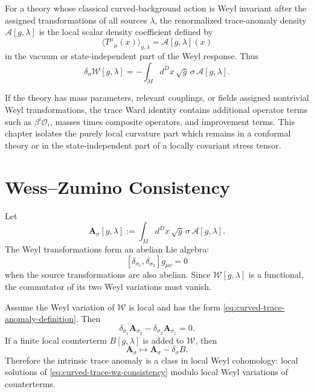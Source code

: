 \begin{definition}
\label{def:curved-trace-anomaly-density}
For a theory whose classical curved-background action is Weyl invariant
after the assigned transformations of all sources \(\lambda\), the
renormalized trace-anomaly density \(\mathcal A[g,\lambda]\) is the local
scalar density coefficient defined by
\[
  \langle T^\mu{}_\mu(x)\rangle_{g,\lambda}
  =
  \mathcal A[g,\lambda](x)
\]
in the vacuum or state-independent part of the Weyl response.  Thus
\begin{equation}
  \delta_\sigma\mathcal W[g,\lambda]
  =
  -\int_M d^D x\,\sqrt g\,\sigma\,\mathcal A[g,\lambda].
  \label{eq:curved-trace-anomaly-definition}
\end{equation}
\end{definition}

If the theory has mass parameters, relevant couplings, or fields assigned
nontrivial Weyl transformations, the trace Ward identity contains additional
operator terms such as \(\beta^i\mathcal O_i\), masses times composite
operators, and improvement terms.  This chapter isolates the purely local
curvature part which remains in a conformal theory or in the state-independent
part of a locally covariant stress tensor.

\section{Wess--Zumino Consistency}

Let
\[
  \mathbf A_\sigma[g,\lambda]
  :=
  \int_M d^D x\,\sqrt g\,\sigma\,\mathcal A[g,\lambda].
\]
The Weyl transformations form an abelian Lie algebra:
\[
  [\delta_{\sigma_1},\delta_{\sigma_2}]g_{\mu\nu}=0
\]
when the source transformations are also abelian.  Since
\(\mathcal W[g,\lambda]\) is a functional, the commutator of its two Weyl
variations must vanish.

\begin{remark}
\label{rem:curved-trace-wz-consistency}
Assume the Weyl variation of \(\mathcal W\) is local and has the form
\eqref{eq:curved-trace-anomaly-definition}.  Then
\begin{equation}
  \delta_{\sigma_1}\mathbf A_{\sigma_2}
  -
  \delta_{\sigma_2}\mathbf A_{\sigma_1}
  =
  0.
  \label{eq:curved-trace-wz-consistency}
\end{equation}
If a finite local counterterm \(B[g,\lambda]\) is added to
\(\mathcal W\), then
\begin{equation}
  \mathbf A_\sigma\longmapsto
  \mathbf A_\sigma-\delta_\sigma B.
  \label{eq:curved-trace-counterterm-coboundary}
\end{equation}
Therefore the intrinsic trace anomaly is a class in local Weyl cohomology:
local solutions of \eqref{eq:curved-trace-wz-consistency} modulo local Weyl
variations of counterterms.
\end{remark}


